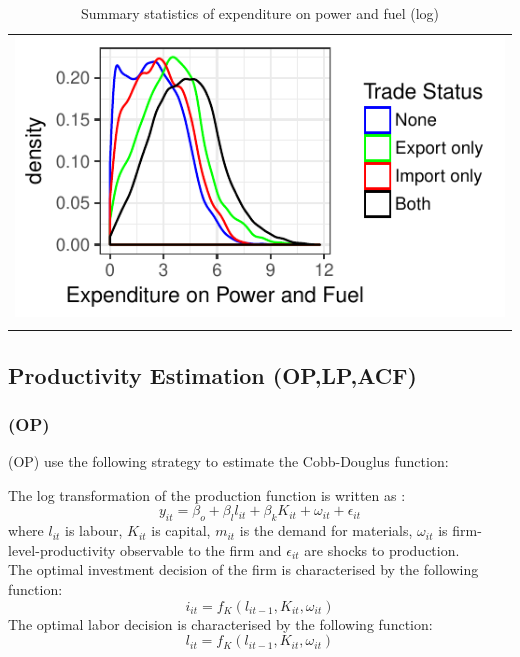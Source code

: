 \documentclass[11pt]{article}
\begin{document}
\begin{center}
\begin{table}[tp]
\caption{Summary statistics of expenditure on power and fuel (log)}
\begin{tabular}{c}
 \includegraphics{./PICS/denslpower.pdf}   \\ 
   \\  
\end{tabular}
\end{table}
\end{center}

\subsection{Productivity Estimation (OP,LP,ACF)}\label{prodest}
\subsubsection{\cite{olley1992dynamics} (OP) }\label{op}

 \cite{olley1992dynamics} (OP) use the
following strategy to estimate the Cobb-Douglus function: 


The log transformation of the production function is written as : 
\begin{equation}
y_{it} = \beta_{o} + \beta_{l}l_{it} + \beta_{k}K_{it} + \omega_{it} + \epsilon_{it} 
\end{equation}
where $l_{it}$ is labour, $K_{it}$ is capital, $m_{it}$  is
the demand for materials, $\omega_{it}$ is firm-level-productivity
observable to the firm and $\epsilon_{it}$ are shocks to production.\\
The optimal investment decision of the firm is characterised by the following
function:
\begin{equation}
i_{it}= f_{K}(l_{it-1}, K_{it}, \omega_{it})
\end{equation}
The optimal labor decision is characterised by the following function:
\begin{equation}
l_{it}= f_{K}(l_{it-1}, K_{it}, \omega_{it})
\end{equation}
\end{document}

